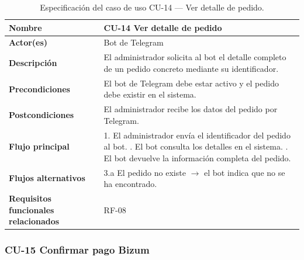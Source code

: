 \begin{table}[H]
\centering
\small
\begin{tabular}{|m{}|m{}|}
\hline
\textbf{Nombre} & CU-14 Ver detalle de pedido \\ \hline
\textbf{Actor(es)} & Bot de Telegram \\ \hline
\textbf{Descripción} & El administrador solicita al bot el detalle completo de un pedido concreto mediante su identificador. \\ \hline
\textbf{Precondiciones} & El bot de Telegram debe estar activo y el pedido debe existir en el sistema. \\ \hline
\textbf{Postcondiciones} & El administrador recibe los datos del pedido por Telegram. \\ \hline
\textbf{Flujo principal} & 1. El administrador envía el identificador del pedido al bot. \newline 2. El bot consulta los detalles en el sistema. \newline 3. El bot devuelve la información completa del pedido. \\ \hline
\textbf{Flujos alternativos} & 3.a El pedido no existe $\rightarrow$ el bot indica que no se ha encontrado. \\ \hline
\textbf{Requisitos funcionales relacionados} & RF-08 \\ \hline
\end{tabular}
\caption{Especificación del caso de uso CU-14 — Ver detalle de pedido.}
\end{table}

\clearpage

\subsubsection{CU-15 Confirmar pago Bizum}

